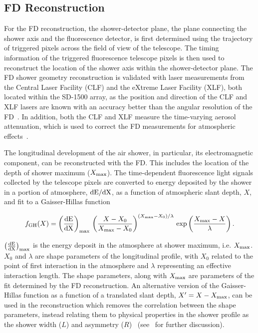 \subsection{FD Reconstruction}\label{ssec:fd_reconstruction}
For the FD reconstruction, the shower-detector plane, the plane connecting the shower axis and the fluorescence detector, is first determined using the trajectory of triggered pixels across the field of view of the telescope.
The timing information of the triggered fluorescence telescope pixels is then used to reconstruct the location of the shower axis within the shower-detector plane.
The FD shower geometry reconstruction is validated with laser measurements from the Central Laser Facility (CLF) and the eXtreme Laser Facility (XLF), both located within the SD-1500 array, as the position and direction of the CLF and XLF lasers are known with an accuracy better than the angular resolution of the FD~\cite{auger_nima2010_fd}.
In addition, both the CLF and XLF measure the time-varying aerosol attenuation, which is used to correct the FD measurements for atmospheric effects~\cite{auger_jinst2013_clf}.

The longitudinal development of the air shower, in particular, its electromagnetic component, can be reconstructed with the FD.
This includes the location of the depth of shower maximum ($X_{\rm max}$).
The time-dependent fluorescence light signals collected by the telescope pixels are converted to energy deposited by the shower in a portion of atmosphere, $\rm{d}E / \rm{d}X$, as a function of atmospheric slant depth, $X$, and fit to a Gaisser-Hillas function~\cite{gaisser_icrc1977_gh}

\begin{equation}
    f_{\rm GH}(X) = \left( \frac{\rm{d}E}{\rm{d}X} \right)_{\rm max}\,\left( \frac{X - X_{0}}{X_{\rm max} - X_{0}} \right)^{(X_{\rm max} - X_{0}) / \lambda}\,\exp\left(\frac{X_{\rm max} - X}{\lambda}\right). \label{eq:gh_energy_deposit}
\end{equation}

\noindent
$\left(\frac{\rm{d}E}{\rm{d}X}\right)_{\rm max}$ is the energy deposit in the atmosphere at shower maximum, i.e. $X_{\rm max}$. 
$X_{0}$ and $\lambda$ are shape parameters of the longitudinal profile, with $X_{0}$ related to the point of first interaction in the atmosphere and $\lambda$ representing an effective interaction length.
The shape parameters, along with $X_{\rm max}$ are parameters of the fit determined by the FD reconstruction.
An alternative version of the Gaisser-Hillas function as a function of a translated slant depth, $X^{\prime} = X - X_{\rm max}$, can be used in the reconstruction which removes the correlation between the shape parameters, instead relating them to physical properties in the shower profile as the shower width ($L$) and asymmetry ($R$)~\cite{andringa_astropartphys2011_longitudinalprofiles, auger_jcap2019_longitudinalprofiles} (see~ for further discussion).

